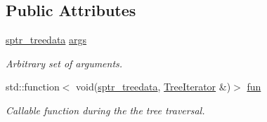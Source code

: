 \subsection*{Public Attributes}
\begin{DoxyCompactItemize}
\item 
\hyperlink{typedefs_8h_a9a6fab8407274f7c3ab719f6e822ea3a}{sptr\+\_\+treedata} \hyperlink{classTree_ac2ff3911dfe768b18be9f6cc2baca89e}{args}\hypertarget{classTree_ac2ff3911dfe768b18be9f6cc2baca89e}{}\label{classTree_ac2ff3911dfe768b18be9f6cc2baca89e}

\begin{DoxyCompactList}\small\item\em Arbitrary set of arguments. \end{DoxyCompactList}\item 
std\+::function$<$ void(\hyperlink{typedefs_8h_a9a6fab8407274f7c3ab719f6e822ea3a}{sptr\+\_\+treedata}, \hyperlink{classTreeIterator}{Tree\+Iterator} \&)$>$ \hyperlink{classTree_ad98f51efc931f96c687c65d4387d19e9}{fun}
\begin{DoxyCompactList}\small\item\em Callable function during the the tree traversal. \end{DoxyCompactList}\end{DoxyCompactItemize}
